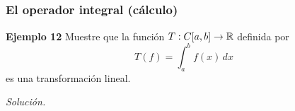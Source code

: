 
\subsection{}

\begin{frame}\frametitle{El operador integral (cálculo)}

\begin{ej}{\textbf{Ejemplo 12}}
	\justifying
	Muestre que la función  $T:C[a,b]\to \mathbb{R}$ definida por 
	\[
		T(f) = \int_{a}^{b} \! f(x)\,dx
	\]
	es una transformación lineal.
	
\end{ej}
\textit{Solución.}

\end{frame}

